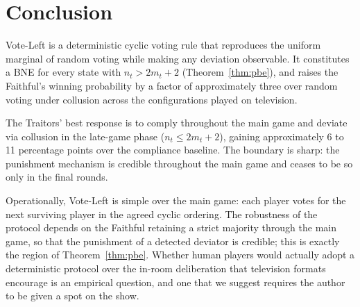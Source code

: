 \documentclass[11pt,a4paper]{article}
\begin{document}
\section{Conclusion}

Vote-Left is a deterministic cyclic voting rule that reproduces the
uniform marginal of random voting while making any deviation observable.
It constitutes a BNE for every state with \(n_t > 2m_t + 2\)
(Theorem~\ref{thm:pbe}), and raises the Faithful's winning probability
by a factor of approximately three over random voting under collusion
across the configurations played on television.

The Traitors' best response is to comply throughout the main game and
deviate via collusion in the late-game phase (\(n_t \leq 2m_t + 2\)),
gaining approximately 6 to 11 percentage points over the compliance
baseline. The boundary is sharp: the punishment mechanism is credible
throughout the main game and ceases to be so only in the final rounds.

Operationally, Vote-Left is simple over the main game: each player
votes for the next surviving player in the agreed cyclic ordering. The
robustness of the protocol depends on the Faithful retaining a strict
majority through the main game, so that the punishment of a detected
deviator is credible; this is exactly the region of
Theorem~\ref{thm:pbe}. Whether human players would actually adopt a
deterministic protocol over the in-room deliberation that television
formats encourage is an empirical question, and one that we suggest requires the
author to be given a spot on the show.



\end{document}
